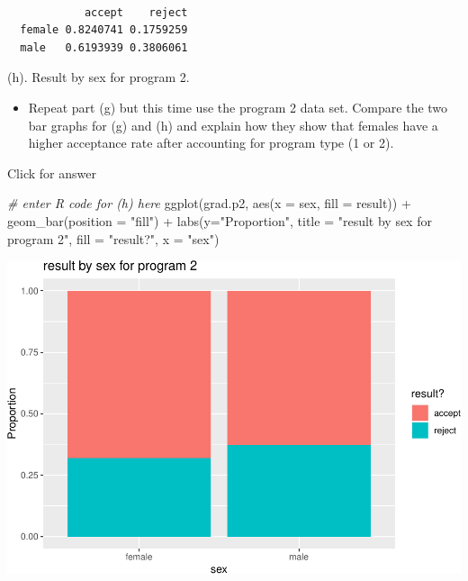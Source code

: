 \documentclass[
]{book}
\newenvironment{Shaded}{\begin{snugshade}}{\end{snugshade}}
\newcommand{\AttributeTok}[1]{\textcolor[rgb]{0.77,0.63,0.00}{#1}}
\newcommand{\CommentTok}[1]{\textcolor[rgb]{0.56,0.35,0.01}{\textit{#1}}}
\newcommand{\DecValTok}[1]{\textcolor[rgb]{0.00,0.00,0.81}{#1}}
\newcommand{\FunctionTok}[1]{\textcolor[rgb]{0.00,0.00,0.00}{#1}}
\newcommand{\NormalTok}[1]{#1}
\newcommand{\SpecialCharTok}[1]{\textcolor[rgb]{0.00,0.00,0.00}{#1}}
\newcommand{\StringTok}[1]{\textcolor[rgb]{0.31,0.60,0.02}{#1}}
\providecommand{\tightlist}{%
  \setlength{\itemsep}{0pt}\setlength{\parskip}{0pt}}
\begin{document}
\begin{Shaded}
\end{Shaded}

\begin{verbatim}
        
            accept    reject
  female 0.8240741 0.1759259
  male   0.6193939 0.3806061
\end{verbatim}

(h). Result by sex for program 2.

\begin{itemize}
\tightlist
\item
  Repeat part (g) but this time use the program 2 data set. Compare the two bar graphs for (g) and (h) and explain how they show that females have a higher acceptance rate after accounting for program type (1 or 2).
\end{itemize}

Click for answer

\begin{Shaded}
\begin{Highlighting}[]
\CommentTok{\# enter R code for (h) here}
\FunctionTok{ggplot}\NormalTok{(grad.p2, }\FunctionTok{aes}\NormalTok{(}\AttributeTok{x =}\NormalTok{ sex, }\AttributeTok{fill =}\NormalTok{ result)) }\SpecialCharTok{+}
 \FunctionTok{geom\_bar}\NormalTok{(}\AttributeTok{position =} \StringTok{"fill"}\NormalTok{) }\SpecialCharTok{+}
 \FunctionTok{labs}\NormalTok{(}\AttributeTok{y=}\StringTok{"Proportion"}\NormalTok{, }\AttributeTok{title =} \StringTok{"result by sex for program 2"}\NormalTok{,}
 \AttributeTok{fill =} \StringTok{"result?"}\NormalTok{, }\AttributeTok{x =} \StringTok{"sex"}\NormalTok{)}
\end{Highlighting}
\end{Shaded}

\includegraphics[width=1\linewidth]{Class_Activity_4_files/figure-latex/unnamed-chunk-31-1}
\end{document}
